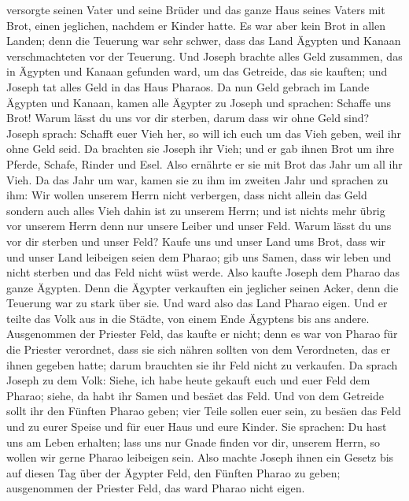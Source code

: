 versorgte seinen Vater und seine Brüder und das ganze Haus seines Vaters
mit Brot, einen jeglichen, nachdem er Kinder hatte.  Es war
aber kein Brot in allen Landen; denn die Teuerung war sehr schwer, dass
das Land Ägypten und Kanaan verschmachteten vor der Teuerung.
 Und Joseph brachte alles Geld zusammen, das in Ägypten und
Kanaan gefunden ward, um das Getreide, das sie kauften; und Joseph tat
alles Geld in das Haus Pharaos.  Da nun Geld gebrach im
Lande Ägypten und Kanaan, kamen alle Ägypter zu Joseph und sprachen:
Schaffe uns Brot! Warum lässt du uns vor dir sterben, darum dass wir
ohne Geld sind?  Joseph sprach: Schafft euer Vieh her, so
will ich euch um das Vieh geben, weil ihr ohne Geld seid. 
Da brachten sie Joseph ihr Vieh; und er gab ihnen Brot um ihre Pferde,
Schafe, Rinder und Esel. Also ernährte er sie mit Brot das Jahr um all
ihr Vieh.  Da das Jahr um war, kamen sie zu ihm im zweiten
Jahr und sprachen zu ihm: Wir wollen unserem Herrn nicht verbergen, dass
nicht allein das Geld sondern auch alles Vieh dahin ist zu unserem
Herrn; und ist nichts mehr übrig vor unserem Herrn denn nur unsere
Leiber und unser Feld.  Warum lässt du uns vor dir sterben
und unser Feld? Kaufe uns und unser Land ums Brot, dass wir und unser
Land leibeigen seien dem Pharao; gib uns Samen, dass wir leben und nicht
sterben und das Feld nicht wüst werde.  Also kaufte Joseph
dem Pharao das ganze Ägypten. Denn die Ägypter verkauften ein jeglicher
seinen Acker, denn die Teuerung war zu stark über sie. Und ward also das
Land Pharao eigen.  Und er teilte das Volk aus in die
Städte, von einem Ende Ägyptens bis ans andere. 
Ausgenommen der Priester Feld, das kaufte er nicht; denn es war von
Pharao für die Priester verordnet, dass sie sich nähren sollten von dem
Verordneten, das er ihnen gegeben hatte; darum brauchten sie ihr Feld
nicht zu verkaufen.  Da sprach Joseph zu dem Volk: Siehe,
ich habe heute gekauft euch und euer Feld dem Pharao; siehe, da habt ihr
Samen und besäet das Feld.  Und von dem Getreide sollt ihr
den Fünften Pharao geben; vier Teile sollen euer sein, zu besäen das
Feld und zu eurer Speise und für euer Haus und eure Kinder.
 Sie sprachen: Du hast uns am Leben erhalten; lass uns nur
Gnade finden vor dir, unserem Herrn, so wollen wir gerne Pharao
leibeigen sein.  Also machte Joseph ihnen ein Gesetz bis
auf diesen Tag über der Ägypter Feld, den Fünften Pharao zu geben;
ausgenommen der Priester Feld, das ward Pharao nicht eigen.
